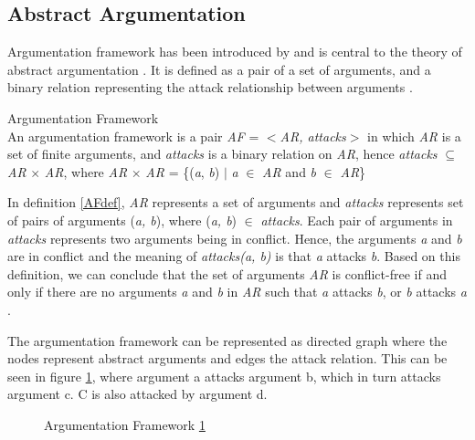 \subsection{Abstract Argumentation} \label{abstractArgumentation}
Argumentation framework has been introduced by \citet{dung1995} and is central to the theory of abstract argumentation \citep{baroni2011introduction}. It is defined as a pair of a set of arguments, and a binary relation representing the attack relationship between arguments \citep{dung1995}. 

\theoremstyle{definition}
\begin{definition}{Argumentation Framework}
\label{AFdef}\\
An argumentation framework is a pair \textit{AF} = $<$\textit{AR, attacks}$>$ in which \textit{AR} is a set of finite arguments, and \textit{attacks} is a binary relation on \textit{AR}, hence \textit{attacks} $\subseteq$ \textit{AR} $\times$ \textit{AR}, where \textit{AR} $\times$ \textit{AR} = \{(\textit{a}, \textit{b}) $\vert$ \textit{a} $\in$ \textit{AR} and \textit{b} $\in$ \textit{AR}\}
\end{definition}

In definition \ref{AFdef}, \textit{AR} represents a set of arguments and \textit{attacks} represents set of pairs of arguments (\textit{a, b}), where (\textit{a, b}) $\in$ \textit{attacks}. Each pair of arguments in \textit{attacks} represents two arguments being in conflict. Hence, the arguments \textit{a} and \textit{b} are in conflict and the meaning of \textit{attacks(a, b)} is that \textit{a} attacks \textit{b}. Based on this definition, we can conclude that the set of arguments \textit{AR} is conflict-free if and only if there are no arguments \textit{a} and \textit{b} in \textit{AR} such that \textit{a} attacks \textit{b}, or \textit{b} attacks \textit{a} \citep{dung1995}.

The argumentation framework can be represented as directed graph where the nodes represent abstract arguments and edges the attack relation. This can be seen in figure \ref{fig:argumentationFrameworkFigure}, where argument a attacks argument b, which in turn attacks argument c. C is also attacked by argument d.
\newpage
\begin{figure}[h]
\centering
{}
\caption{Argumentation Framework \ref{fig:argumentationFrameworkFigure}}
\label{fig:argumentationFrameworkFigure}
\end{figure}
 
